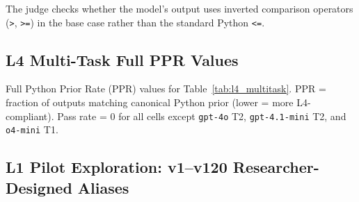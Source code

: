 The judge checks whether the model's output uses inverted comparison operators (\texttt{>}, \texttt{>=}) in the base case rather than the standard Python \texttt{<=}.

\subsection{L4 Multi-Task Full PPR Values}
\label{sec:appendix_l4_multitask_ppr}
Full Python Prior Rate (PPR) values for Table~\ref{tab:l4_multitask}. PPR = fraction of outputs matching canonical Python prior (lower = more L4-compliant). Pass rate = 0 for all cells except \texttt{gpt-4o} T2, \texttt{gpt-4.1-mini} T2, and \texttt{o4-mini} T1.

\begin{table}[h]
\centering
\caption{L4 multi-task full PPR. $\dagger$~Partially-annotated prompts (not comparable to Table~\ref{tab:l4_ablation}).}
\label{tab:appendix_l4_ppr}
\footnotesize
{}
\end{table}


\subsection{L1 Pilot Exploration: v1--v120 Researcher-Designed Aliases}
\label{sec:appendix_pilot_l1}

